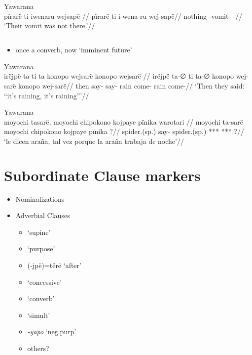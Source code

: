 \documentclass{memoir}
\begin{document}
\ex Yawarana \\
\label{ctorat-19}    \begingl
    \glpreamble  pïrarë ti iwenaru wejsapë //
    \gla pïrarë ti i-wena-ru wej-sapë//
    \glb nothing  -vomit- -//
        \glft ‘Their vomit was not there.’//  
    \endgl 
\xe

\subsection{\texorpdfstring{ \label{sec:sareimn}}{ }}

\begin{itemize}
\tightlist
\item
  once a converb, now `imminent future'
\end{itemize}

\ex Yawarana \\
\label{ctorat-25}    \begingl
    \glpreamble  irëjpë ta ti ta konopo wejsarë konopo wejsarë //
    \gla irëjpë ta-∅ ti ta-∅ konopo wej-sarë konopo wej-sarë//
    \glb then say-  say- rain come- rain come-//
        \glft ‘Then they said: “it’s raining, it’s raining”.’//  
    \endgl 
\xe

\ex Yawarana \\
\label{ctoaragrme-25}    \begingl
    \glpreamble  moyochi tasarë, moyochi chipokono kojpaye pïnika warotari //
    \gla moyochi ta-sarë moyochi chipokono kojpaye pïnika ?//
    \glb spider.(sp.) say- spider.(sp.) *** ***  ?//
        \glft ‘le dicen araña, tal vez porque la araña trabaja de noche’//  
    \endgl 
\xe

\section{Subordinate Clause markers}

\begin{itemize}
\tightlist
\item
  Nominalizations
\item
  Adverbial Clauses

  \begin{itemize}
  \tightlist
  \item
     `supine'
  \item
     `purpose'
  \item
    (‑jpë)=tërë `after'
  \item
     `concessive'
  \item
     `converb'
  \item
     `simult'
  \item
    \emph{‑yapo} `neg.purp'
  \item
    others?
  \end{itemize}
\end{itemize}
\end{document}
